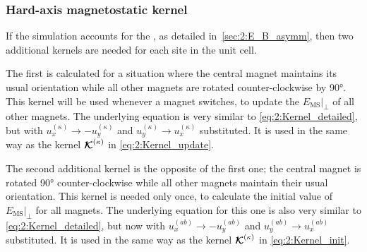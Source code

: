 \vspace{-1em}

\subsubsection{Hard-axis magnetostatic kernel}\label{sec:2:Kernels:Perp}
If the simulation accounts for the , as detailed in~\cref{sec:2:E_B_asymm}, then two additional kernels are needed for each site in the unit cell. \par
The first is calculated for a situation where the central magnet maintains its usual orientation while all other magnets are rotated counter-clockwise by \ang{90}.
This kernel will be used whenever a magnet switches, to update the  $\left. E_{\mathrm{MS}} \right|_{\perp}$ of all other magnets.
The underlying equation is very similar to \cref{eq:2:Kernel_detailed}, but with $u_x^{(\kappa)} \rightarrow -u_y^{(\kappa)}$ and $u_y^{(\kappa)} \rightarrow u_x^{(\kappa)}$ substituted.
It is used in the same way as the kernel $\boldsymbol{\mathbf{\mathcal{K}}}^{(\kappa)}$ in \cref{eq:2:Kernel_update}. \par
The second additional kernel is the opposite of the first one; the central magnet is rotated \ang{90} counter-clockwise while all other magnets maintain their usual orientation.
This kernel is needed only once, to calculate the initial value of $\left. E_{\mathrm{MS}} \right|_{\perp}$ for all magnets.
The underlying equation for this one is also very similar to \cref{eq:2:Kernel_detailed}, but now with $u_x^{(ab)} \rightarrow -u_y^{(ab)}$ and $u_y^{(ab)} \rightarrow u_x^{(ab)}$ substituted.
It is used in the same way as the kernel $\boldsymbol{\mathbf{\mathcal{K}}}^{(\kappa)}$ in \cref{eq:2:Kernel_init}.

